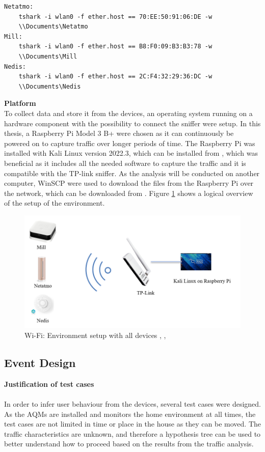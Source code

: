 \newpage
\begin{verbatim}
Netatmo:
    tshark -i wlan0 -f ether.host == 70:EE:50:91:06:DE -w 
    \\Documents\Netatmo
Mill:
    tshark -i wlan0 -f ether.host == B8:F0:09:B3:B3:78 -w 
    \\Documents\Mill
Nedis:
    tshark -i wlan0 -f ether.host == 2C:F4:32:29:36:DC -w 
    \\Documents\Nedis
\end{verbatim}

\noindent
\textbf{Platform}\\
To collect data and store it from the devices, an operating system running on a hardware component with the possibility to connect the sniffer were setup. In this thesis, a Raspberry Pi Model 3 B+ were chosen as it can continuously be powered on to capture traffic over longer periods of time. The Raspberry Pi was installed with Kali Linux version 2022.3, which can be installed from \cite{KaliLinux}, which was beneficial as it includes all the needed software to capture the traffic and it is compatible with the TP-link sniffer. As the analysis will be conducted on another computer, WinSCP were used to download the files from the Raspberry Pi over the network, which can be downloaded from \cite{WinSCP}. Figure \ref{fig:Environment} shows a logical overview of the setup of the environment.  

\begin{figure} [H]
    \centering
    \includegraphics[width=1\textwidth]{figures/Environment.png}
    \caption{\gls{Wi-Fi}: Environment setup with all devices \cite{MillSense}, \cite{NetatmoDevice}, \cite{NedisDevice}}
    \label{fig:Environment}
\end{figure}

\subsection{Event Design}
\textbf{Justification of test cases}\\\\
In order to infer user behaviour from the devices, several test cases were designed. As the \gls{AQM}s are installed and monitors the home environment at all times, the test cases are not limited in time or place in the house as they can be moved. The traffic characteristics are unknown, and therefore a hypothesis tree can be used to better understand how to proceed based on the results from the traffic analysis. 

